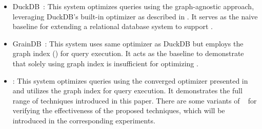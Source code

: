 \begin{itemize}
\item DuckDB~\cite{duckdb}: This system optimizes queries using the graph-agnostic approach, leveraging DuckDB's built-in optimizer as described in . It serves as the naive baseline for extending a relational database system to support \spjm.

\item GrainDB~\cite{graindb}: This system uses same optimizer as DuckDB but employs the graph index () for query execution. It acts as the baseline to demonstrate that solely using graph index is insufficient for optimizing \spjm.


\item \name: This system optimizes queries using the converged optimizer presented in  and utilizes the graph index for query execution. It demonstrates the full range of techniques introduced in this paper. There are some variants
of \name~ for verifying the effectiveness of the proposed techniques, which will be introduced in the corresponding experiments.
\end{itemize}

